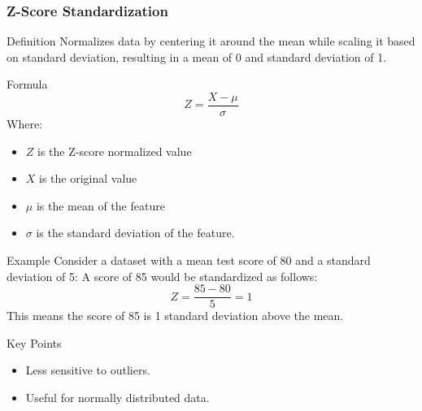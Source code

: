 \documentclass[aspectratio=169]{beamer}
\begin{document}
\begin{frame}[fragile]
    \frametitle{Z-Score Standardization}
    \begin{block}{Definition}
        Normalizes data by centering it around the mean while scaling it based on standard deviation, resulting in a mean of 0 and standard deviation of 1.
    \end{block}
    
    \begin{block}{Formula}
        \begin{equation}
        Z = \frac{X - \mu}{\sigma}
        \end{equation}
        Where:
        \begin{itemize}
            \item $Z$ is the Z-score normalized value
            \item $X$ is the original value
            \item $\mu$ is the mean of the feature
            \item $\sigma$ is the standard deviation of the feature.
        \end{itemize}
    \end{block}
    
    \begin{block}{Example}
        Consider a dataset with a mean test score of 80 and a standard deviation of 5: A score of 85 would be standardized as follows:
        \begin{equation}
        Z = \frac{85 - 80}{5} = 1
        \end{equation}
        This means the score of 85 is 1 standard deviation above the mean.
    \end{block}
    
    \begin{block}{Key Points}
        \begin{itemize}
            \item Less sensitive to outliers.
            \item Useful for normally distributed data.
        \end{itemize}
    \end{block}
\end{frame}
\end{document}
